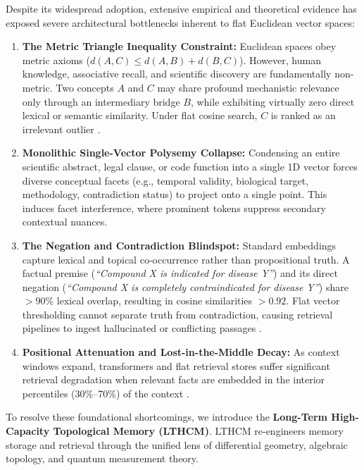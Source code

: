 \documentclass[11pt,a4paper]{article}
\begin{document}
Despite its widespread adoption, extensive empirical and theoretical evidence has exposed severe architectural bottlenecks inherent to flat Euclidean vector spaces:

\begin{enumerate}
    \item \textbf{The Metric Triangle Inequality Constraint:} Euclidean spaces obey metric axioms ($d(A, C) \le d(A, B) + d(B, C)$). However, human knowledge, associative recall, and scientific discovery are fundamentally non-metric. Two concepts $A$ and $C$ may share profound mechanistic relevance only through an intermediary bridge $B$, while exhibiting virtually zero direct lexical or semantic similarity. Under flat cosine search, $C$ is ranked as an irrelevant outlier \cite{yang2018hotpotqa}.
    \item \textbf{Monolithic Single-Vector Polysemy Collapse:} Condensing an entire scientific abstract, legal clause, or code function into a single 1D vector forces diverse conceptual facets (e.g., temporal validity, biological target, methodology, contradiction status) to project onto a single point. This induces facet interference, where prominent tokens suppress secondary contextual nuances.
    \item \textbf{The Negation and Contradiction Blindspot:} Standard embeddings capture lexical and topical co-occurrence rather than propositional truth. A factual premise (\emph{``Compound X is indicated for disease Y''}) and its direct negation (\emph{``Compound X is completely contraindicated for disease Y''}) share $>90\%$ lexical overlap, resulting in cosine similarities $>0.92$. Flat vector thresholding cannot separate truth from contradiction, causing retrieval pipelines to ingest hallucinated or conflicting passages \cite{thorne2018fever,schuster2021vitaminc}.
    \item \textbf{Positional Attenuation and Lost-in-the-Middle Decay:} As context windows expand, transformers and flat retrieval stores suffer significant retrieval degradation when relevant facts are embedded in the interior percentiles (30\%--70\%) of the context \cite{liu2024lost}.
\end{enumerate}

To resolve these foundational shortcomings, we introduce the \textbf{Long-Term High-Capacity Topological Memory (LTHCM)}. LTHCM re-engineers memory storage and retrieval through the unified lens of differential geometry, algebraic topology, and quantum measurement theory.
\end{document}
